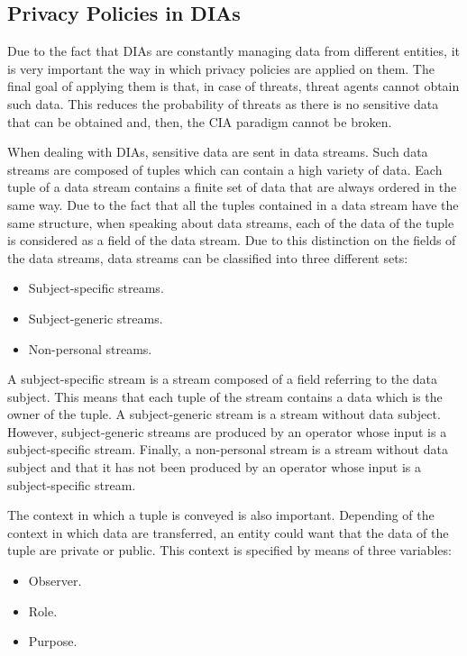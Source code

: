\subsection{Privacy Policies in DIAs}

Due to the fact that DIAs are constantly managing data from different entities, it is very important the way in which privacy policies are applied on them. The final goal of applying them is that, in case of threats, threat agents cannot obtain such data. This reduces the probability of threats as there is no sensitive data that can be obtained and, then, the CIA paradigm cannot be broken.

When dealing with DIAs, sensitive data are sent in data streams. Such data streams are composed of tuples which can contain a high variety of data. Each tuple of a data stream contains a finite set of data that are always ordered in the same way. Due to the fact that all the tuples contained in a data stream have the same structure, when speaking about data streams, each of the data of the tuple is considered as a field of the data stream. Due to this distinction on the fields of the data streams, data streams can be classified into three different sets:

\begin{itemize}

\item Subject-specific streams.
\item Subject-generic streams.
\item Non-personal streams.

\end{itemize}

A subject-specific stream is a stream composed of a field referring to the data subject. This means that each tuple of the stream contains a data which is the owner of the tuple. A subject-generic stream is a stream without data subject. However, subject-generic streams are produced by an operator whose input is a subject-specific stream. Finally, a non-personal stream is a stream without data subject and that it has not been produced by an operator whose input is a subject-specific stream.

The context in which a tuple is conveyed is also important. Depending of the context in which data are transferred, an entity could want that the data of the tuple are private or public. This context is specified by means of three variables:

\begin{itemize}

\item Observer.
\item Role.
\item Purpose.

\end{itemize}

